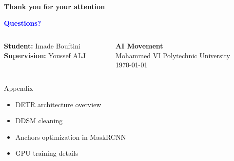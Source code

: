 \documentclass[8pt,aspectratio=169,xcolor=dvipsnames]{beamer}
\begin{document}
\begin{frame}{\quad}
\centering
\vspace{0.5cm}
                \Huge{\textbf{\textcolor{OliveGreen}{        Thank you for your attention}}}
        \vspace{0.3cm}

        \huge{\textbf{\textcolor{Blue}{Questions?}}}

\vspace{0.5cm}

\begin{columns}
\small
\begin{column}{0.5\textwidth}
\centering
\textbf{Student:} Imade Bouftini\\
\textbf{Supervision:} Youssef ALJ 
\end{column}
\begin{column}{0.5\textwidth}
\centering
\textbf{AI Movement}\\
Mohammed VI Polytechnic University\\
\today
\end{column}
\end{columns}

\vspace{0.3cm}

\begin{grayblock}{Appendix}
    \begin{itemize}
        \item DETR architecture overview
        \item DDSM cleaning
        \item Anchors optimization in MaskRCNN
        \item GPU training details
    \end{itemize}
\end{grayblock}

\end{frame}


\end{document}

